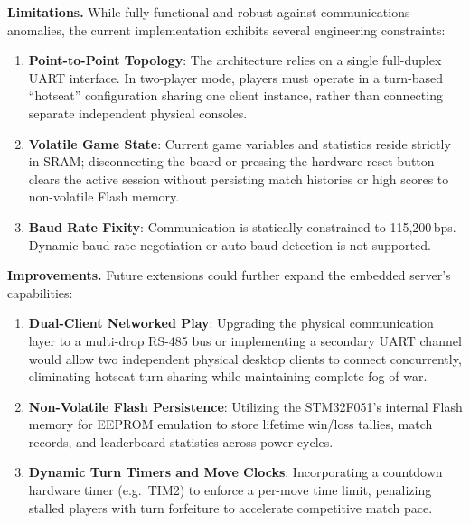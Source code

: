 \textbf{Limitations.} While fully functional and robust against communications anomalies, the current implementation exhibits several engineering constraints:
\begin{enumerate}
    \item \textbf{Point-to-Point Topology}: The architecture relies on a single full-duplex UART interface. In two-player mode, players must operate in a turn-based ``hotseat'' configuration sharing one client instance, rather than connecting separate independent physical consoles.
    \item \textbf{Volatile Game State}: Current game variables and statistics reside strictly in SRAM; disconnecting the board or pressing the hardware reset button clears the active session without persisting match histories or high scores to non-volatile Flash memory.
    \item \textbf{Baud Rate Fixity}: Communication is statically constrained to 115,200\,bps. Dynamic baud-rate negotiation or auto-baud detection is not supported.
\end{enumerate}

\textbf{Improvements.} Future extensions could further expand the embedded server's capabilities:
\begin{enumerate}
    \item \textbf{Dual-Client Networked Play}: Upgrading the physical communication layer to a multi-drop RS-485 bus or implementing a secondary UART channel would allow two independent physical desktop clients to connect concurrently, eliminating hotseat turn sharing while maintaining complete fog-of-war.
    \item \textbf{Non-Volatile Flash Persistence}: Utilizing the STM32F051's internal Flash memory for EEPROM emulation to store lifetime win/loss tallies, match records, and leaderboard statistics across power cycles.
    \item \textbf{Dynamic Turn Timers and Move Clocks}: Incorporating a countdown hardware timer (e.g.\ TIM2) to enforce a per-move time limit, penalizing stalled players with turn forfeiture to accelerate competitive match pace.
\end{enumerate}

